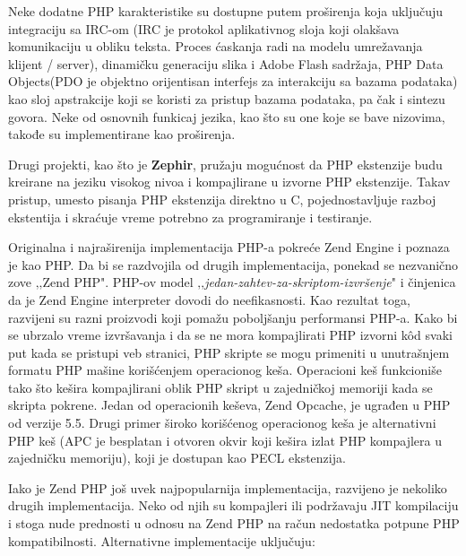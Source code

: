 \documentclass[a4paper]{article}
\begin{document}
{Neke dodatne PHP karakteristike su dostupne putem proširenja koja uključuju integraciju sa IRC-om (IRC je protokol aplikativnog sloja koji
olakšava komunikaciju u obliku teksta. Proces ćaskanja radi na modelu umrežavanja klijent / server), dinamičku generaciju slika i Adobe Flash sadržaja, PHP Data Objects(PDO je objektno orijentisan interfejs za interakciju sa bazama podataka) kao sloj apstrakcije koji se koristi za pristup bazama podataka, pa čak i sintezu govora. Neke od osnovnih funkicaj jezika, kao što su one koje se bave nizovima, takođe su implementirane kao proširenja\cite{corePHP}.

Drugi projekti, kao što je \textbf{Zephir}\cite{zephir}, pružaju mogućnost da PHP ekstenzije budu kreirane na jeziku visokog nivoa i kompajlirane u izvorne PHP ekstenzije. Takav pristup, umesto pisanja PHP ekstenzija direktno u C, pojednostavljuje razboj ekstentija i skraćuje vreme potrebno za programiranje i testiranje.

Originalna i najraširenija implementacija PHP-a pokreće Zend Engine i poznaza je kao PHP. Da bi se razdvojila od drugih implementacija, ponekad se nezvanično zove ‚‚Zend PHP". PHP-ov model ‚‚\textit{jedan-zahtev-za-skriptom-izvršenje}" i činjenica da je Zend Engine interpreter dovodi do neefikasnosti. Kao rezultat toga, razvijeni su razni proizvodi koji pomažu poboljšanju performansi PHP-a. Kako bi se ubrzalo vreme izvršavanja i da se ne mora kompajlirati PHP izvorni k\^{o}d svaki put kada se pristupi veb stranici, PHP skripte se mogu primeniti u unutrašnjem formatu PHP mašine korišćenjem operacionog keša. Operacioni keš funkcioniše tako što kešira kompajlirani oblik PHP skript u zajedničkoj memoriji kada se skripta pokrene. Jedan od operacionih keševa, Zend Opcache\cite{zend}, je ugrađen u PHP od verzije 5.5. Drugi primer široko korišćenog operacionog keša je alternativni PHP keš (APC je besplatan i otvoren okvir koji kešira izlat PHP kompajlera u zajedničku memoriju)\cite{php}, koji je dostupan kao PECL ekstenzija.

Iako je Zend PHP još uvek najpopularnija implementacija, razvijeno je nekoliko drugih implementacija. Neko od njih su kompajleri ili podržavaju
JIT\cite{jit} kompilaciju i stoga nude prednosti u odnosu na Zend PHP na račun nedostatka potpune PHP kompatibilnosti. Alternativne implementacije uključuju:

}
\end{document}
